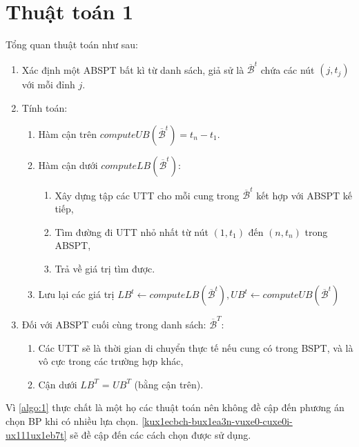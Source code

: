 \documentclass[../main.tex]{subfiles}
\begin{document}
\section{Thuật toán 1}\label{thuux1eadt-touxe1n-1}

Tổng quan thuật toán như sau:

\begin{enumerate}
\def\labelenumi{\arabic{enumi}.}
\tightlist
\item
  Xác định một ABSPT bất kì từ danh sách, giả sử là
  \(\overline {\mathcal B} ^{t}\) chứa các nút \((j, t_j)\) với mỗi đỉnh
  \(j\).
\item
  Tính toán:

  \begin{enumerate}
  \def\labelenumii{\arabic{enumii}.}
  \tightlist
  \item
    Hàm cận trên \(computeUB(\overline {\mathcal B} ^{t}) = t_n -t_1\).
  \item
    Hàm cận dưới \(computeLB(\overline {\mathcal B} ^{t}):\)

    \begin{enumerate}
    \def\labelenumiii{\arabic{enumiii}.}
    \tightlist
    \item
      Xây dựng tập các UTT cho mỗi cung trong
      \(\overline {\mathcal B} ^{t}\) kết hợp với ABSPT kế tiếp,
    \item
      Tìm đường đi UTT nhỏ nhất từ nút \((1, t_1)\) đến \((n, t_n)\)
      trong ABSPT,
    \item
      Trả về giá trị tìm được.
    \end{enumerate}
  \item
    Lưu lại các giá trị
    \(LB^t \gets computeLB(\overline {\mathcal B} ^{t}), UB^t \gets computeUB(\overline {\mathcal B} ^{t})\)
  \end{enumerate}
\item
  Đối với ABSPT cuối cùng trong danh sách: \(\overline {\mathcal B} ^{T}\):

  \begin{enumerate}
  \def\labelenumii{\arabic{enumii}.}
  \tightlist
  \item
    Các UTT sẽ là thời gian di chuyển thực tế nếu cung có trong BSPT, và
    là vô cực trong các trường hợp khác,
  \item
    Cận dưới \(LB^T\) = \(UB^T\) (bằng cận trên).
  \end{enumerate}
\end{enumerate}

Vì \autoref{algo:1} thực chất là một họ các thuật toán nên không đề cập đến
phương án chọn BP khi có nhiều lựa chọn. \autoref{kux1ecbch-bux1ea3n-vuxe0-cuxe0i-ux111ux1eb7t} sẽ đề cập đến
các cách chọn được sử dụng.
\end{document}
